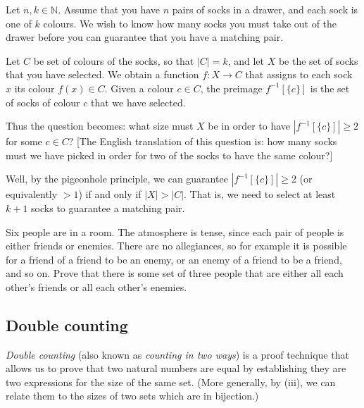 \begin{example}
Let $n, k \in \mathbb{N}$. Assume that you have $n$ pairs of socks in a drawer, and each sock is one of $k$ colours. We wish to know how many socks you must take out of the drawer before you can guarantee that you have a matching pair.

Let $C$ be set of colours of the socks, so that $|C| = k$, and let $X$ be the set of socks that you have selected. We obtain a function $f : X \to C$ that assigns to each sock $x$ its colour $f(x) \in C$. Given a colour $c \in C$, the preimage $f^{-1}[\{c\}]$ is the set of socks of colour $c$ that we have selected.

Thus the question becomes: what size must $X$ be in order to have $|f^{-1}[\{c\}]| \ge 2$ for some $c \in C$? [The English translation of this question is: how many socks must we have picked in order for two of the socks to have the same colour?]

Well, by the pigeonhole principle, we can guarantee $|f^{-1}[\{c\}]| \ge 2$ (or equivalently $>1$) if and only if $|X| > |C|$. That is, we need to select at least $k + 1$ socks to guarantee a matching pair.
\end{example}

\begin{exercise}
Six people are in a room. The atmosphere is tense, since each pair of people is either friends or enemies. There are no allegiances, so for example it is possible for a friend of a friend to be an enemy, or an enemy of a friend to be a friend, and so on. Prove that there is some set of three people that are either all each other's friends or all each other's enemies.
\end{exercise}

\subsection*{Double counting}

\textit{Double counting} (also known as \textit{counting in two ways})
is a proof technique that allows us to prove that two natural numbers are equal by establishing they are two expressions for the size of the same set. (More generally, by (iii), we can relate them to the sizes of two sets which are in bijection.)

